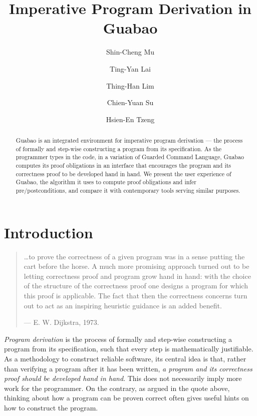 \documentclass[runningheads]{llncs}
\begin{document}
\title{Imperative Program Derivation in Guabao
}

\author{Shin-Cheng Mu%
\and
Ting-Yan Lai\and
Thing-Han Lim\and
Chien-Yuan Su\and
Hsien-En Tzeng%
}
%



\maketitle              %
%
\begin{abstract}
Guabao is an integrated environment for imperative program derivation --- the process of formally and step-wise constructing a program from its specification.
As the programmer types in the code, in a variation of Guarded Command Language,
Guabao computes its proof obligations in an interface that encourages the program and its correctness proof to be developed hand in hand.
We present the user experience of Guabao, the algorithm it uses to compute proof obligations and infer pre/postconditions, and compare it with contemporary tools serving similar purposes.
\end{abstract}

\section{Introduction}

\begin{quote}
\ldots to prove the correctness of a given program was in a sense putting the cart before the horse. A much more promising approach turned out to be letting correctness proof and program grow hand in hand: with the choice of the structure of the correctness proof one designs a program for which this proof is applicable. The fact that then the correctness concerns turn out to act as an inspiring heuristic guidance is an added benefit.
\begin{flushright}
--- E. W. Dijkstra, 1973. \cite{Dijkstra:74:Programming}
\end{flushright}
\end{quote}

\emph{Program derivation} is the process of formally and step-wise constructing a program from its specification, such that every step is mathematically justifiable. As a methodology to construct reliable software, its central idea is that, rather than verifying a program after it has been written, \emph{a program and its correctness proof should be developed hand in hand}.
This does not necessarily imply more work for the programmer.
On the contrary, as argued in the quote above, thinking about how a program can be proven correct often gives useful hints on how to construct the program.
\end{document}
